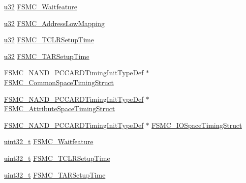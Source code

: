 \begin{DoxyCompactItemize}
\item 
\hyperlink{agilefox_2library_2inc_2stm32f10x__type_8h_a2caf5cd7bcdbe1eefa727f44ffb10bac}{u32} \hyperlink{struct_f_s_m_c___p_c_c_a_r_d_init_type_def_a7e197ef7f3d5a1e6bf5b52b1224d59c1}{F\+S\+M\+C\+\_\+\+Waitfeature}
\item 
\hyperlink{agilefox_2library_2inc_2stm32f10x__type_8h_a2caf5cd7bcdbe1eefa727f44ffb10bac}{u32} \hyperlink{struct_f_s_m_c___p_c_c_a_r_d_init_type_def_a2722c6febaf495d03808dd6656e8c13e}{F\+S\+M\+C\+\_\+\+Address\+Low\+Mapping}
\item 
\hyperlink{agilefox_2library_2inc_2stm32f10x__type_8h_a2caf5cd7bcdbe1eefa727f44ffb10bac}{u32} \hyperlink{struct_f_s_m_c___p_c_c_a_r_d_init_type_def_a40cec452b1d528e73d45bb0395df1ea3}{F\+S\+M\+C\+\_\+\+T\+C\+L\+R\+Setup\+Time}
\item 
\hyperlink{agilefox_2library_2inc_2stm32f10x__type_8h_a2caf5cd7bcdbe1eefa727f44ffb10bac}{u32} \hyperlink{struct_f_s_m_c___p_c_c_a_r_d_init_type_def_a0be55ad90cf48723c8cef753ee920201}{F\+S\+M\+C\+\_\+\+T\+A\+R\+Setup\+Time}
\item 
\hyperlink{struct_f_s_m_c___n_a_n_d___p_c_c_a_r_d_timing_init_type_def}{F\+S\+M\+C\+\_\+\+N\+A\+N\+D\+\_\+\+P\+C\+C\+A\+R\+D\+Timing\+Init\+Type\+Def} $\ast$ \hyperlink{struct_f_s_m_c___p_c_c_a_r_d_init_type_def_afac8f6c87ad18b6caa550fd73e4b16ea}{F\+S\+M\+C\+\_\+\+Common\+Space\+Timing\+Struct}
\item 
\hyperlink{struct_f_s_m_c___n_a_n_d___p_c_c_a_r_d_timing_init_type_def}{F\+S\+M\+C\+\_\+\+N\+A\+N\+D\+\_\+\+P\+C\+C\+A\+R\+D\+Timing\+Init\+Type\+Def} $\ast$ \hyperlink{struct_f_s_m_c___p_c_c_a_r_d_init_type_def_a304c79f957bd7fc3d83878af92c1c16d}{F\+S\+M\+C\+\_\+\+Attribute\+Space\+Timing\+Struct}
\item 
\hyperlink{struct_f_s_m_c___n_a_n_d___p_c_c_a_r_d_timing_init_type_def}{F\+S\+M\+C\+\_\+\+N\+A\+N\+D\+\_\+\+P\+C\+C\+A\+R\+D\+Timing\+Init\+Type\+Def} $\ast$ \hyperlink{struct_f_s_m_c___p_c_c_a_r_d_init_type_def_a34514ae2564eb2eb0cd46e5bbf05b607}{F\+S\+M\+C\+\_\+\+I\+O\+Space\+Timing\+Struct}
\item 
\hyperlink{_p_e___types_8h_a33594304e786b158f3fb30289278f5af}{uint32\+\_\+t} \hyperlink{struct_f_s_m_c___p_c_c_a_r_d_init_type_def_a3ffd8c627ffe3ac90dfbfe93a8b97c26}{F\+S\+M\+C\+\_\+\+Waitfeature}
\item 
\hyperlink{_p_e___types_8h_a33594304e786b158f3fb30289278f5af}{uint32\+\_\+t} \hyperlink{struct_f_s_m_c___p_c_c_a_r_d_init_type_def_a15db9675791f6f9c7fd82fe1084ff694}{F\+S\+M\+C\+\_\+\+T\+C\+L\+R\+Setup\+Time}
\item 
\hyperlink{_p_e___types_8h_a33594304e786b158f3fb30289278f5af}{uint32\+\_\+t} \hyperlink{struct_f_s_m_c___p_c_c_a_r_d_init_type_def_ac83f977e01623595e0aa8dd0b1eb3fcc}{F\+S\+M\+C\+\_\+\+T\+A\+R\+Setup\+Time}
\end{DoxyCompactItemize}


